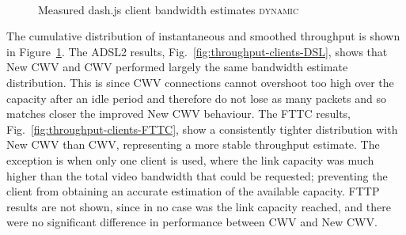 \documentclass[10pt,sigconf]{acmart}
\begin{document}
\begin{figure}[t!]
  \centering
  \\
  \caption{Measured dash.js client bandwidth estimates \textsc{dynamic}}
  \label{fig:throughput-clients}
\end{figure}

The cumulative distribution of instantaneous and smoothed throughput is shown in 
Figure~\ref{fig:throughput-clients}. 
%
The ADSL2 results, Fig.\ \ref{fig:throughput-clients-DSL}, shows that New CWV and CWV performed largely the same bandwidth estimate distribution. This is since CWV connections cannot overshoot too high over the capacity after an idle period and therefore do not lose as many packets and so matches closer the improved New CWV behaviour. 
The FTTC results, Fig.\ \ref{fig:throughput-clients-FTTC}, show a consistently tighter distribution with New CWV than CWV, representing a more stable throughput estimate. The exception is when only one client is used, where the link capacity was much higher than the total video bandwidth that could be requested; preventing the client from obtaining an accurate estimation of the available capacity.
%
FTTP results are not shown, since in no case was the link capacity reached, and there were no significant difference in performance between CWV and New CWV.
\end{document}
